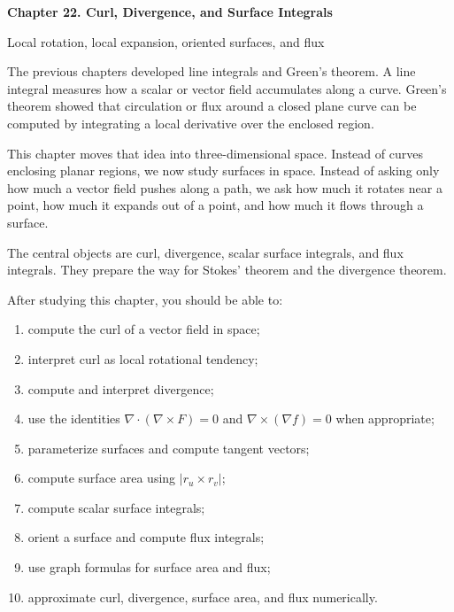 \documentclass[11pt]{article}
\newcommand{\grad}{\nabla}
\begin{document}
\begin{center}
  {\LARGE\bfseries Chapter 22. Curl, Divergence, and Surface Integrals\par}
  \vspace{0.3em}
  {\large Local rotation, local expansion, oriented surfaces, and flux\par}
\end{center}

\begin{chapteroverviewbox}
The previous chapters developed line integrals and Green's theorem. A line integral measures how a scalar or vector field accumulates along a curve. Green's theorem showed that circulation or flux around a closed plane curve can be computed by integrating a local derivative over the enclosed region.

This chapter moves that idea into three-dimensional space. Instead of curves enclosing planar regions, we now study surfaces in space. Instead of asking only how much a vector field pushes along a path, we ask how much it rotates near a point, how much it expands out of a point, and how much it flows through a surface.

The central objects are curl, divergence, scalar surface integrals, and flux integrals. They prepare the way for Stokes' theorem and the divergence theorem.
\end{chapteroverviewbox}

\begin{goalbox}
After studying this chapter, you should be able to:
\begin{enumerate}
  \item compute the curl of a vector field in space;
  \item interpret curl as local rotational tendency;
  \item compute and interpret divergence;
  \item use the identities $\grad\cdot(\grad\times F)=0$ and $\grad\times(\grad f)=0$ when appropriate;
  \item parameterize surfaces and compute tangent vectors;
  \item compute surface area using $|r_u\times r_v|$;
  \item compute scalar surface integrals;
  \item orient a surface and compute flux integrals;
  \item use graph formulas for surface area and flux;
  \item approximate curl, divergence, surface area, and flux numerically.
\end{enumerate}
\end{goalbox}
\end{document}
